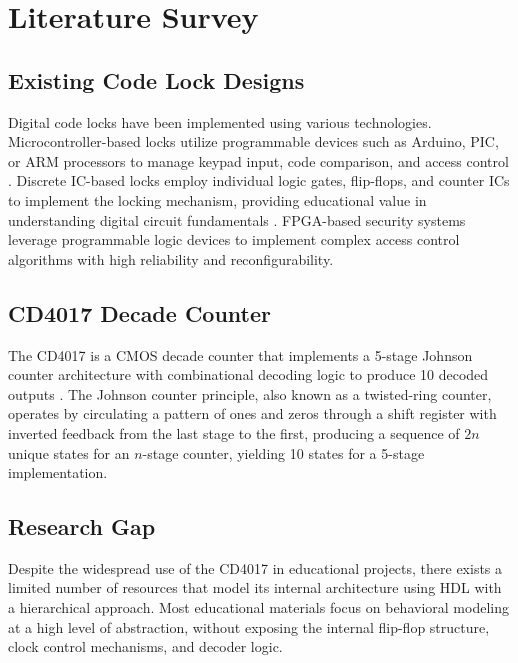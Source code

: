 \documentclass[12pt,a4paper]{report}
\begin{document}
\chapter{Literature Survey}

\section{Existing Code Lock Designs}

Digital code locks have been implemented using various technologies. Microcontroller-based locks utilize programmable devices such as Arduino, PIC, or ARM processors to manage keypad input, code comparison, and access control \cite{mano2013digital}. Discrete IC-based locks employ individual logic gates, flip-flops, and counter ICs to implement the locking mechanism, providing educational value in understanding digital circuit fundamentals \cite{friendlywire2021cd4017}. FPGA-based security systems leverage programmable logic devices to implement complex access control algorithms with high reliability and reconfigurability.

\section{CD4017 Decade Counter}

The CD4017 is a CMOS decade counter that implements a 5-stage Johnson counter architecture with combinational decoding logic to produce 10 decoded outputs \cite{ti2023cd4017}. The Johnson counter principle, also known as a twisted-ring counter, operates by circulating a pattern of ones and zeros through a shift register with inverted feedback from the last stage to the first, producing a sequence of $2n$ unique states for an $n$-stage counter, yielding 10 states for a 5-stage implementation.

\section{Research Gap}

Despite the widespread use of the CD4017 in educational projects, there exists a limited number of resources that model its internal architecture using HDL with a hierarchical approach. Most educational materials focus on behavioral modeling at a high level of abstraction, without exposing the internal flip-flop structure, clock control mechanisms, and decoder logic.
\end{document}
